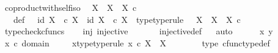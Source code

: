 \begin{isabellebody}
\endisatagproof
{\isafoldproof}%
%
\isadelimproof
\isanewline
%
\endisadelimproof
\isanewline
{}\isamarkupfalse%
\ coproduct{\isacharunderscore}{\kern0pt}with{\isacharunderscore}{\kern0pt}self{\isacharunderscore}{\kern0pt}iso{\isacharcolon}{\kern0pt}\isanewline
\ \ {\isachardoublequoteopen}X\ {\isasymCoprod}\ X\ {\isasymcong}\ X\ {\isasymtimes}\isactrlsub c\ {\isasymOmega}{\isachardoublequoteclose}\isanewline
%
\isadelimproof
%
\endisadelimproof
%
\isatagproof
{}\isamarkupfalse%
\ {\isacharminus}{\kern0pt}\ \isanewline
\ \ \isamarkupfalse%
\ {\isasymrho}\ \ {\isasymrho}{\isacharunderscore}{\kern0pt}def{\isacharcolon}{\kern0pt}\ {\isachardoublequoteopen}{\isasymrho}\ {\isacharequal}{\kern0pt}\ {\isasymlangle}id\ X{\isacharcomma}{\kern0pt}\ {\isasymt}\ {\isasymcirc}\isactrlsub c\ {\isasymbeta}\isactrlbsub X\isactrlesub {\isasymrangle}\ {\isasymamalg}\ {\isasymlangle}id\ X{\isacharcomma}{\kern0pt}\ {\isasymf}\ {\isasymcirc}\isactrlsub c\ {\isasymbeta}\isactrlbsub X\isactrlesub {\isasymrangle}{\isachardoublequoteclose}\ \ {\isasymrho}{\isacharunderscore}{\kern0pt}type{\isacharbrackleft}{\kern0pt}type{\isacharunderscore}{\kern0pt}rule{\isacharbrackright}{\kern0pt}{\isacharcolon}{\kern0pt}\ {\isachardoublequoteopen}{\isasymrho}\ {\isacharcolon}{\kern0pt}\ X\ {\isasymCoprod}\ X\ {\isasymrightarrow}\ X\ {\isasymtimes}\isactrlsub c\ {\isasymOmega}{\isachardoublequoteclose}\isanewline
\ \ \ \ \isamarkupfalse%
\ typecheck{\isacharunderscore}{\kern0pt}cfuncs\isanewline
\ \ \isamarkupfalse%
\ {\isasymrho}{\isacharunderscore}{\kern0pt}inj{\isacharcolon}{\kern0pt}\ {\isachardoublequoteopen}injective\ {\isasymrho}{\isachardoublequoteclose}\isanewline
\ \ \ \ \isamarkupfalse%
\ injective{\isacharunderscore}{\kern0pt}def\isanewline
\ \ \isamarkupfalse%
{\isacharparenleft}{\kern0pt}auto{\isacharparenright}{\kern0pt}\isanewline
\ \ \ \ \isamarkupfalse%
\ x\ y\ \isanewline
\ \ \ \ \isamarkupfalse%
\ {\isachardoublequoteopen}x\ {\isasymin}\isactrlsub c\ domain\ {\isasymrho}{\isachardoublequoteclose}\ \isamarkupfalse%
\ \isamarkupfalse%
\ x{\isacharunderscore}{\kern0pt}type{\isacharbrackleft}{\kern0pt}type{\isacharunderscore}{\kern0pt}rule{\isacharbrackright}{\kern0pt}{\isacharcolon}{\kern0pt}\ {\isachardoublequoteopen}x\ {\isasymin}\isactrlsub c\ X\ {\isasymCoprod}\ X{\isachardoublequoteclose}\isanewline
\ \ \ \ \ \ \isamarkupfalse%
\ {\isasymrho}{\isacharunderscore}{\kern0pt}type\ cfunc{\isacharunderscore}{\kern0pt}type{\isacharunderscore}{\kern0pt}def\ \isamarkupfalse%

\end{isabellebody}
